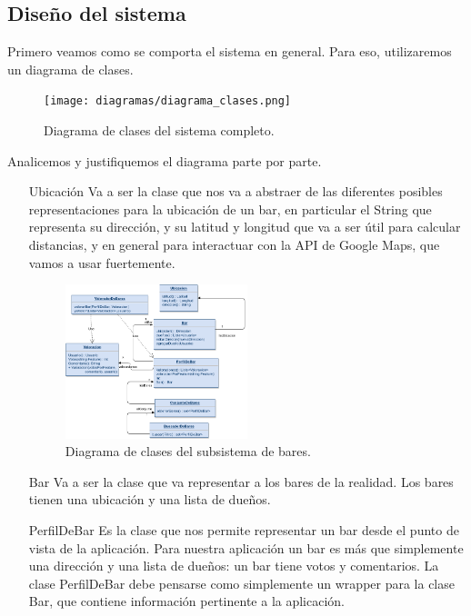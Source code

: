 \subsection{Diseño del sistema}

Primero veamos como se comporta el sistema en general. Para eso, utilizaremos un diagrama de clases.


\begin{figure}[H]
  \centering
  \texttt{[image: diagramas/diagrama\_clases.png]}
  \caption{\normalfont Diagrama de clases del sistema completo.}
\end{figure} 

Analicemos y justifiquemos el diagrama parte por parte.

\begin{itemize}
\item[Ubicación] Va a ser la clase que nos va a abstraer de las diferentes posibles representaciones para la ubicación de un bar, en particular el String que representa su dirección, y su latitud y longitud que va a ser útil para calcular distancias, y en general para interactuar con la API de Google Maps, que vamos a usar fuertemente.

\begin{figure}[H]
  \centering
  \includegraphics[width=0.5\textwidth]{diagramas/bar_clases.png}
  \caption{\normalfont Diagrama de clases del subsistema de bares.}
\end{figure}

\item[Bar] Va a ser la clase que va representar a los bares de la realidad. Los bares tienen una ubicación y una lista de dueños.

\item[PerfilDeBar] Es la clase que nos permite representar un bar desde el punto de vista de la aplicación. Para nuestra aplicación un bar es más que simplemente una dirección y una lista de dueños: un bar tiene votos y comentarios. La clase PerfilDeBar debe pensarse como simplemente un wrapper para la clase Bar, que contiene información pertinente a la aplicación.


\end{itemize}
